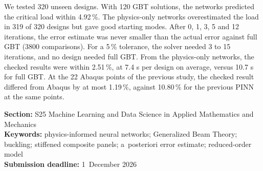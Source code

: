 \documentclass[11pt,a4paper]{article}
\begin{document}
We tested 320 unseen designs. With 120 GBT solutions, the networks predicted the critical load within 4.92\,\%. The physics-only networks overestimated the load in 319 of 320 designs but gave good starting modes. After 0, 1, 3, 5 and 12 iterations, the error estimate was never smaller than the actual error against full GBT (3800 comparisons). For a 5\,\% tolerance, the solver needed 3 to 15 iterations, and no design needed full GBT. From the physics-only networks, the checked results were within 2.51\,\%, at 7.4 s per design on average, versus 10.7 s for full GBT. At the 22 Abaqus points of the previous study, the checked result differed from Abaqus by at most 1.19\,\%, against 10.80\,\% for the previous PINN at the same points.

\vfill
{\small\color{muted}
\textbf{Section:} S25 Machine Learning and Data Science in Applied Mathematics and Mechanics\\
\textbf{Keywords:} physics-informed neural networks; Generalized Beam Theory; buckling; stiffened composite panels; a~posteriori error estimate; reduced-order model\\
\textbf{Submission deadline:} 1~December 2026\par}
\end{document}
